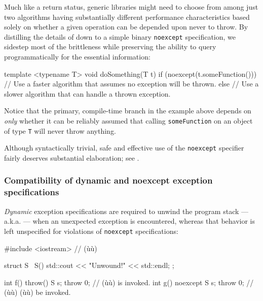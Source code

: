 \noindent Much like a return status, generic libraries might need to choose from
among just two algorithms having substantially different performance
characteristics based solely on whether a given operation can be
depended upon never to throw. By distilling the details of
 down to a simple binary
\lstinline!noexcept! specification, we sidestep most of the brittleness
while preserving the ability to query programmatically for the essential
information:

\begin{emcppslisting}
template <typename T>
void doSomething(T t)
{
    if (noexcept(t.someFunction()))
    {
        // Use a faster algorithm that assumes no exception will be thrown.
    }
    else
    {
        // Use a slower algorithm that can handle a thrown exception.
    }
}
\end{emcppslisting}
    

\noindent Notice that the primary, compile-time branch in the example above
depends on \emph{only} whether it can be reliably assumed that calling
\lstinline!someFunction! on an object of type \lstinline!T! will never throw
anything.

Although syntactically trivial, safe and effective use of the
\lstinline!noexcept! specifier fairly deserves substantial elaboration; see
.

\subsubsection[Compatibility of dynamic and \lstinline!noexcept! exception specifications]{Compatibility of dynamic and {\SubsubsecCode noexcept} exception specifications}\label{compatibility-of-dynamic-and-noexcept-exception-specifications}

\emph{Dynamic} exception specifications are required to unwind the
program stack --- a.k.a.  --- when an unexpected
exception is encountered, whereas that behavior is left unspecified for
violations of \lstinline!noexcept! specifications:

\begin{emcppslisting}
#include <iostream>  // (ù{}ù)

struct S { ~S() { std::cout << "Unwound!" << std::endl; } };

int f() throw()  { S s; throw 0; }  // (ù{}ù) is invoked.
int g() noexcept { S s; throw 0; }  // (ù{}ù) (ù{}ù) be invoked.
\end{emcppslisting}
    

